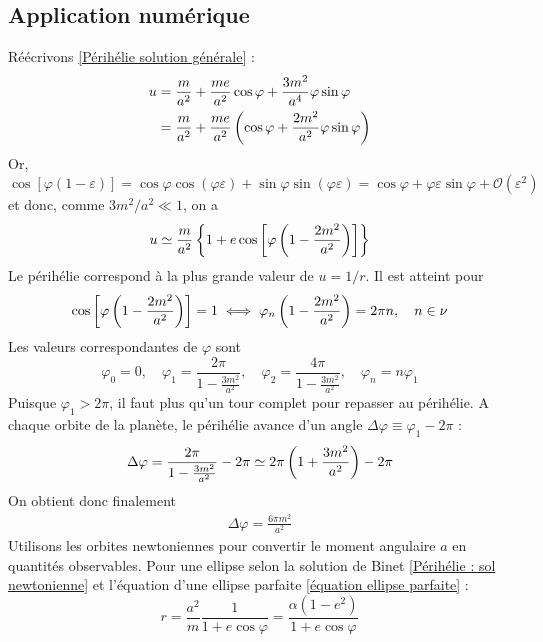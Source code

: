 \subsection{Application numérique}
Réécrivons \ref{Périhélie solution générale} : 
\begin{align}
    u &= \frac{m}{a^2} + \frac{me}{a^2} \cos \varphi + \frac{3m^2}{a^4} \varphi \sin \varphi \\
    &= \frac{m}{a^2} + \frac{me}{a^2} \left( \cos \varphi + \frac{2m^2}{a^2} \varphi \sin \varphi \right)
\end{align}
Or, $\cos [ \varphi (1-\varepsilon)] = \cos \varphi \cos (\varphi \varepsilon ) + \sin \varphi \sin (\varphi \varepsilon ) = \cos \varphi + \varphi \varepsilon \sin\varphi + \mathcal{O}(\varepsilon^2)$ et donc, comme $3m^2/a^2 \ll 1$, on a
\begin{equation}
    u \simeq \frac{m}{a^2} \left\{ 1 + e \cos \left[ \varphi \left( 1 - \frac{2m^2}{a^2} \right)\right] \right\}
\end{equation}
Le périhélie correspond à la plus grande valeur de $u = 1/r$. Il est atteint pour 
\begin{equation}
    \cos \left[ \varphi \left( 1 - \frac{2m^2}{a^2} \right)\right] = 1 \iff \varphi_n \left( 1 - \frac{2m^2}{a^2} \right) = 2\pi n, \quad n \in \nu
\end{equation}
Les valeurs correspondantes de $\varphi$ sont
\begin{equation}
    \varphi_0 = 0, \quad \varphi_1 = \frac{2\pi}{1- \frac{3m^2}{a^2}},\quad \varphi_2 = \frac{4\pi}{1- \frac{3m^2}{a^2}}, \quad \varphi_n = n \varphi_1
\end{equation}
Puisque $\varphi_1 > 2\pi$, il faut plus qu'un tour complet pour repasser au périhélie. A chaque orbite de la planète, le périhélie avance d'un angle $\Delta \varphi \equiv \varphi_1 - 2\pi$ : 
\begin{align}
    \Delta \varphi = \frac{2\pi}{1- \frac{3m^2}{a^2}} - 2\pi \simeq 2\pi \left( 1 + \frac{3m^2}{a^2}\right) - 2 \pi
\end{align}
On obtient donc finalement 
\begin{align}
    \boxed{\Delta \varphi = \frac{6\pi m^2}{a^2}}
\end{align}
Utilisons les orbites newtoniennes pour convertir le moment angulaire $a$ en quantités observables. Pour une ellipse selon la solution de Binet \ref{Périhélie : sol newtonienne} et l'équation d'une ellipse parfaite \ref{équation ellipse parfaite} :
\begin{equation}
    r = \frac{a^2}{m} \frac{1}{1 +e \cos\varphi} = \frac{\alpha (1-e^2)}{1 + e \cos \varphi}
\end{equation}

